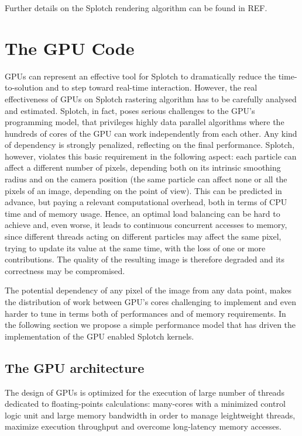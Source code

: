 \documentclass[11pt]{article}
\begin{document}
Further details on the Splotch rendering algorithm can be found in REF.

\section{The GPU Code}

GPUs can represent an effective tool for Splotch to dramatically 
reduce the time-to-solution and to step toward real-time interaction.
However, the real effectiveness of GPUs on Splotch rastering algorithm has to
be carefully analysed and estimated. Splotch, in fact, poses serious challenges 
to the GPU's programming model, that privileges highly data parallel algorithms 
where the hundreds of cores of the GPU can work independently from each other.
Any kind of dependency is strongly penalized, reflecting on the final performance.
Splotch, however, violates this basic requirement in the following aspect:
each particle can affect a different number of pixels, depending both on its intrinsic
smoothing radius and on the camera position (the same particle 
can affect none or all the pixels of an image, depending on the point of view). This 
can be predicted in advance, but paying a relevant computational overhead, both in terms
of CPU time and of memory usage. Hence, an optimal load balancing can be hard to achieve 
and, even worse, it leads to continuous concurrent accesses to memory, since
different threads acting on different particles may affect the same pixel, trying
to update its value at the same time,
with the loss of one or more contributions.
The quality of the resulting image is therefore degraded and its correctness may be
compromised. 

The potential dependency of any pixel of the image from any data point,
makes the distribution of work between GPU's cores challenging to implement
and even harder to tune in terms both of performances and of memory requirements.
In the following section we propose a simple performance model that has
driven the implementation of the GPU enabled Splotch kernels.

\subsection{The GPU architecture}

The design of GPUs is optimized for the execution of large number of threads dedicated to floating-points calculations: 
many-cores with a minimized control logic unit and large memory bandwidth in order to manage leightweight threads, maximize execution throughput and overcome long-latency memory accesses. 
\end{document}
